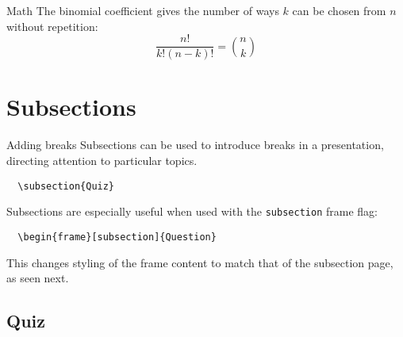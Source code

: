 \documentclass{beamer} %
\begin{document}
\begin{frame}{Math}
  The binomial coefficient gives the number of ways $k$ can be chosen from $n$ without repetition:
  \begin{equation*}
    \frac{n!}{k!(n-k)!} = \binom{n}{k}
  \end{equation*}
\end{frame}

\section{Subsections}

\begin{frame}[fragile]{Adding breaks}
  Subsections can be used to introduce breaks in a presentation, directing
  attention to particular topics.
  \begin{verbatim}  \subsection{Quiz}\end{verbatim}

  Subsections are especially useful when used with the \texttt{subsection} frame
  flag:
  \begin{verbatim}  \begin{frame}[subsection]{Question}\end{verbatim}
  This changes styling of the frame content to match that of the subsection
  page, as seen next.
\end{frame}

\subsection{Quiz}
\end{document}
